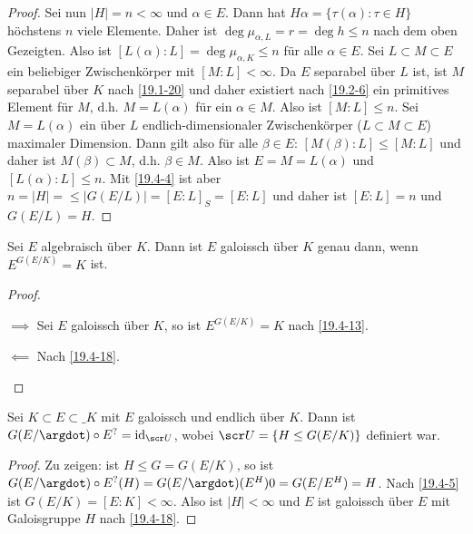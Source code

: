 \begin{st}[Artin]
\begin{proof}
		Sei nun $|H| = n < \infty$ und $\alpha \in E$.
		Dann hat $H\alpha = \{ \tau(\alpha) : \tau \in H \}$ höchstens $n$ viele Elemente.
		Daher ist $\deg \mu_{\alpha, L} = r = \deg h \le n$ nach dem oben Gezeigten. 
		Also ist $[L(\alpha) : L] = \deg \mu_{\alpha, K} \le n$ für alle $\alpha \in E$.
		Sei $L \subset M \subset E$ ein beliebiger Zwischenkörper mit $[M: L] < \infty$.
		Da $E$ separabel über $L$ ist, ist $M$ separabel über $K$ nach \ref{19.1-20} und daher existiert nach \ref{19.2-6} ein primitives Element für $M$, d.h. $M = L(\alpha)$ für ein $\alpha \in M$.
		Also ist $[M : L] \le n$.
		Sei $M = L(\alpha)$ ein über $L$ endlich-dimensionaler Zwischenkörper ($L \subset M \subset E$) maximaler Dimension.
		Dann gilt also für alle $\beta \in E$: $[M(\beta) : L] \le [M : L]$ und daher ist $M(\beta) \subset M$, d.h. $\beta \in M$.
		Also ist $E = M = L(\alpha)$ und $[L(\alpha) : L] \le n$.
		Mit \ref{19.4-4} ist aber $n = |H| = \le |G(E/L)| = [E:L]_S = [E : L]$ und daher ist $[E : L] = n$ und $G(E / L) = H$.
	\end{proof}
\end{st}

\begin{kor} \label{19.4-19}
	Sei $E$ algebraisch über $K$.
	Dann ist $E$ galoissch über $K$ genau dann, wenn $E^{G(E / K)} = K$ ist.
	\begin{proof}
		\begin{segnb}{$\implies$}
			Sei $E$ galoissch über $K$, so ist $E^{G(E/K)} = K$ nach \ref{19.4-13}.
		\end{segnb}
		\begin{segnb}{$\impliedby$}
			Nach \ref{19.4-18}.
		\end{segnb}
	\end{proof}
\end{kor}

\begin{kor} \label{19.4-20}
	Sei $K \subset E \subset \_K$ mit $E$ galoissch und endlich über $K$.
	Dann ist $G(E / \argdot) \circ E^? = \id_{\scr U}$, wobei $\scr U = \{ H \le G(E / K) \}$ definiert war.
	\begin{proof}
		Zu zeigen: ist $H \le G = G(E / K)$, so ist $G(E / \argdot) \circ E^? (H) = G(E / \argdot) (E^H)0= G(E / E^H) = H$.
		Nach \ref{19.4-5} ist $G(E / K) = [E : K] < \infty$.
		Also ist $|H| < \infty$ und $E$ ist galoissch über $E$ mit Galoisgruppe $H$ nach \ref{19.4-18}.
	\end{proof}
\end{kor}

